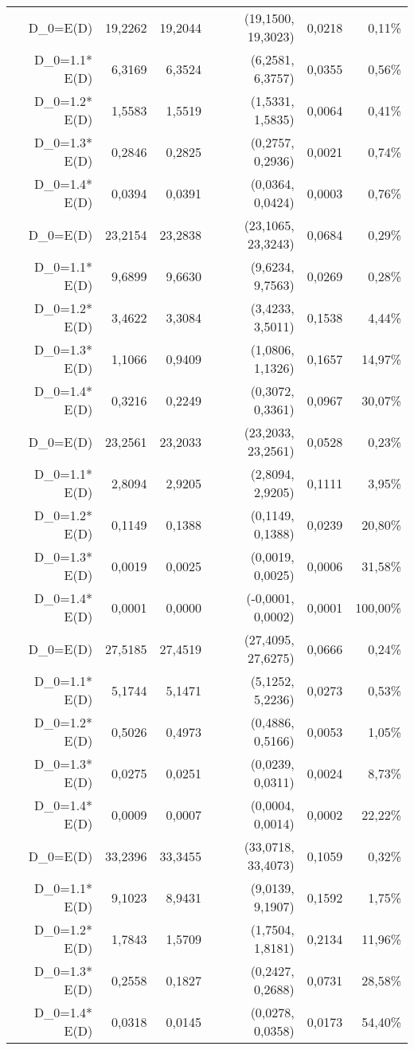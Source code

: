 \documentclass[preprint,12pt]{elsarticle}
\begin{document}
\begin{table}[htbp]
\begin{tabular}{rrrrrr}
    D\_0=E(D) & 19,2262 & 19,2044 & (19,1500, 19,3023) & 0,0218 & 0,11\% \\
    D\_0=1.1* E(D) & 6,3169 & 6,3524 & (6,2581, 6,3757) & 0,0355 & 0,56\% \\
    D\_0=1.2* E(D) & 1,5583 & 1,5519 & (1,5331, 1,5835) & 0,0064 & 0,41\% \\
    D\_0=1.3* E(D) & 0,2846 & 0,2825 & (0,2757, 0,2936) & 0,0021 & 0,74\% \\
    D\_0=1.4* E(D) & 0,0394 & 0,0391 & (0,0364, 0,0424) & 0,0003 & 0,76\% \\
    D\_0=E(D) & 23,2154 & 23,2838 & (23,1065, 23,3243) & 0,0684 & 0,29\% \\
    D\_0=1.1* E(D) & 9,6899 & 9,6630 & (9,6234, 9,7563) & 0,0269 & 0,28\% \\
    D\_0=1.2* E(D) & 3,4622 & 3,3084 & (3,4233, 3,5011) & 0,1538 & 4,44\% \\
    D\_0=1.3* E(D) & 1,1066 & 0,9409 & (1,0806, 1,1326) & 0,1657 & 14,97\% \\
    D\_0=1.4* E(D) & 0,3216 & 0,2249 & (0,3072, 0,3361) & 0,0967 & 30,07\% \\
    D\_0=E(D) & 23,2561 & 23,2033 & (23,2033, 23,2561) & 0,0528 & 0,23\% \\
    D\_0=1.1* E(D) & 2,8094 & 2,9205 & (2,8094, 2,9205) & 0,1111 & 3,95\% \\
    D\_0=1.2* E(D) & 0,1149 & 0,1388 & (0,1149, 0,1388) & 0,0239 & 20,80\% \\
    D\_0=1.3* E(D) & 0,0019 & 0,0025 & (0,0019, 0,0025) & 0,0006 & 31,58\% \\
    D\_0=1.4* E(D) & 0,0001 & 0,0000 & (-0,0001, 0,0002) & 0,0001 & 100,00\% \\
    D\_0=E(D) & 27,5185 & 27,4519 & (27,4095, 27,6275) & 0,0666 & 0,24\% \\
    D\_0=1.1* E(D) & 5,1744 & 5,1471 & (5,1252, 5,2236) & 0,0273 & 0,53\% \\
    D\_0=1.2* E(D) & 0,5026 & 0,4973 & (0,4886, 0,5166) & 0,0053 & 1,05\% \\
    D\_0=1.3* E(D) & 0,0275 & 0,0251 & (0,0239, 0,0311) & 0,0024 & 8,73\% \\
    D\_0=1.4* E(D) & 0,0009 & 0,0007 & (0,0004, 0,0014) & 0,0002 & 22,22\% \\
    D\_0=E(D) & 33,2396 & 33,3455 & (33,0718, 33,4073) & 0,1059 & 0,32\% \\
    D\_0=1.1* E(D) & 9,1023 & 8,9431 & (9,0139, 9,1907) & 0,1592 & 1,75\% \\
    D\_0=1.2* E(D) & 1,7843 & 1,5709 & (1,7504, 1,8181) & 0,2134 & 11,96\% \\
    D\_0=1.3* E(D) & 0,2558 & 0,1827 & (0,2427, 0,2688) & 0,0731 & 28,58\% \\
    D\_0=1.4* E(D) & 0,0318 & 0,0145 & (0,0278, 0,0358) & 0,0173 & 54,40\% \\
    \bottomrule
    \end{tabular}%
  \label{tab:addlabel}%
\end{table}%
\end{document}
